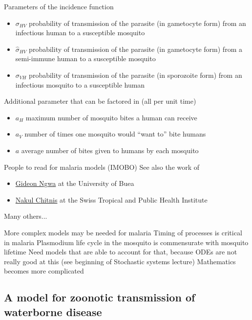 \documentclass[aspectratio=169]{beamer}\usepackage[]{graphicx}\usepackage[]{xcolor}
\begin{document}
\begin{frame}{Parameters of the incidence function}
\begin{itemize}
\item $\sigma_{HV}$ probability of transmission of the parasite (in gametocyte form) from
an infectious human to a susceptible mosquito
\item $\hat\sigma_{HV}$ probability of transmission of the parasite (in gametocyte form) from
a semi-immune human to a susceptible mosquito
\item $\sigma_{VH}$ probability of transmission of the parasite (in sporozoite form) from
an infectious mosquito to a susceptible human
\end{itemize}
\vfill
Additional parameter that can be factored in (all per unit time)
\begin{itemize}
\item $a_H$ maximum number of mosquito bites a human can receive
\item $a_V$ number of times one mosquito would ``want to'' bite humans
\item $a$ average number of bites given to humans by each mosquito
\end{itemize}
\end{frame}

\begin{frame}{People to read for malaria models (IMOBO)}
See also the work of 
\vfill
\begin{itemize}
\item \href{https://scholar.google.com/citations?user=AwKMfZ8AAAAJ&hl=en}{Gideon Ngwa} at the University of Buea
\vfill
\item \href{https://scholar.google.ch/citations?user=BMiKO0UAAAAJ&hl=en}{Nakul Chitnis} at the Swiss Tropical and Public Health Institute
\end{itemize}
\vfill
Many others...
\end{frame}


\begin{frame}{More complex models may be needed for malaria}
Timing of processes is critical in malaria
\vfill
Plasmodium life cycle in the mosquito is commensurate with mosquito lifetime
\vfill
Need models that are able to account for that, because ODEs are not really good at this (see beginning of Stochastic systems lecture)
\vfill
Mathematics becomes more complicated
\end{frame}

\subsection{A model for zoonotic transmission of waterborne disease}
\end{document}
